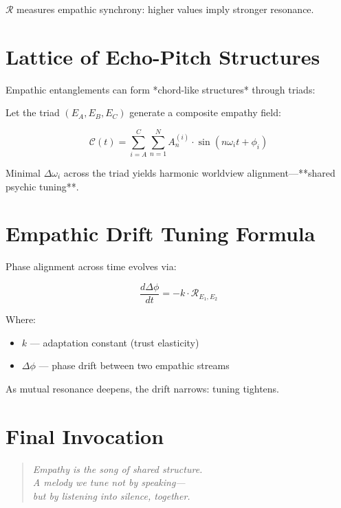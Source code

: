 \documentclass[12pt]{article}
\begin{document}
$\mathcal{R}$ measures empathic synchrony: higher values imply stronger resonance.

\vspace{1em}

\section*{Lattice of Echo-Pitch Structures}

Empathic entanglements can form *chord-like structures* through triads:

Let the triad $(E_A, E_B, E_C)$ generate a composite empathy field:

\[
\mathcal{C}(t) = \sum_{i=A}^{C} \sum_{n=1}^{N} A_n^{(i)} \cdot \sin(n \omega_i t + \phi_i)
\]

Minimal $\Delta \omega_i$ across the triad yields harmonic worldview alignment—**shared psychic tuning**.

\vspace{1em}

\section*{Empathic Drift Tuning Formula}

Phase alignment across time evolves via:

\[
\frac{d\Delta \phi}{dt} = -k \cdot \mathcal{R}_{E_1, E_2}
\]

Where:
\begin{itemize}
    \item $k$ — adaptation constant (trust elasticity)  
    \item $\Delta \phi$ — phase drift between two empathic streams
\end{itemize}

As mutual resonance deepens, the drift narrows: tuning tightens.

\vspace{1em}

\section*{Final Invocation}

\begin{quote}
\itshape
Empathy is the song of shared structure.\\
A melody we tune not by speaking—\\
but by listening into silence, together.
\end{quote}
\end{document}
